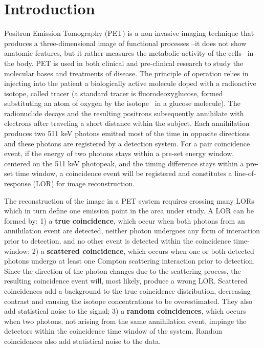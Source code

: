 \documentclass[review]{elsarticle}
\begin{document}
\section{Introduction}
Positron Emission Tomography (PET) is a non invasive imaging technique that produces a three-dimensional image of functional processes --it does not show anatomic features, but it rather  measures the metabolic activity of the cells-- in the body. PET is used in
both clinical and pre-clinical research to study the molecular bases and treatments of
disease. The principle of operation relies in injecting into the patient a  
biologically active molecule doped with a radioactive isotope, called tracer (a standard tracer is fluorodeoxyglucose, formed substituting an atom of oxygen by the isotope \FDG\ in a glucose molecule). The radionuclide decays and the resulting positrons
subsequently annihilate with electrons after traveling a short distance within the subject.
Each annihilation produces two 511 keV photons emitted most of the time in opposite
directions and these photons are registered by a detection system. For a pair coincidence event, if the energy of two photons stays within a
pre-set energy window, centered on the 511 keV photopeak, and the timing difference stays within a pre-set time window, a coincidence event will be registered and constitutes a line-of-response (LOR) for image
reconstruction.

The reconstruction of the image in a PET system requires crossing many LORs which in turn define one emission point in the area under study. A LOR can be formed by: 1) a {\bf true coincidence}, which occur when both photons from an annihilation event are detected, neither photon undergoes any form of interaction prior to detection, and no other event is detected within the coincidence time-window; 2)
a {\bf scattered coincidence}, which occurs when one or both detected photons undergo at least one Compton scattering interaction prior to detection. Since the direction of the photon changes due to the scattering process, the resulting coincidence event will, most likely, produce a wrong LOR. Scattered coincidences add a background to the true coincidence distribution, decreasing contrast and causing the isotope concentrations to be overestimated. They also add statistical noise to the signal; 3)  a {\bf random coincidences}, which occurs when two photons, not arising from the same annihilation event, impinge the detectors within the coincidence time window of the system. Random coincidences also add statistical noise to the data. 
\end{document}
